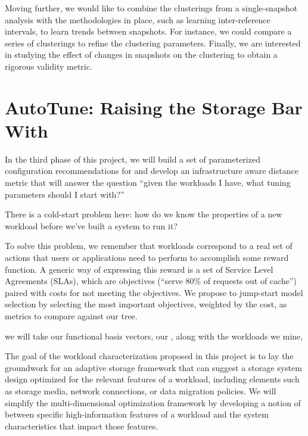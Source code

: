Moving further, we would like to combine the clusterings from a single-snapshot
analysis with the methodologies in place, such as learning inter-reference
intervals, to learn trends between snapshots.
For instance, we could compare a
series of clusterings to refine the clustering parameters.  Finally, we are
interested in studying the effect of changes in snapshots on the clustering to
obtain a rigorous validity metric.
\section{AutoTune: Raising the Storage Bar With \Mws}%


In the third phase of this project, we will build a set of parameterized configuration
recommendations for \mws and develop an infrastructure aware distance metric
that will answer the question ``given the workloads I have, what tuning
parameters should I start with?''

There is a cold-start problem here: how do we know the properties of a new
workload before we've built a system to run it?  

To solve this problem, we remember that workloads correspond to a real set of
actions that users or applications need to perform to accomplish some reward
function.  A generic way of expressing this reward is a set of Service Level
Agreements (SLAs), which are objectives (\eg ``serve 80\% of requests out of
cache'') paired with costs for not meeting the objectives.  We propose to
jump-start model selection by selecting the most important objectives, weighted
by the cost, as metrics to compare against our \mws tree.



we will take our functional basis vectors,
our \mWs, along with the workloads we mine, %


The goal of the workload characterization proposed in this project is to lay
the groundwork for an adaptive storage framework that can suggest a 
storage system design optimized for the relevant features of a workload, including elements such as storage media, network
connections, or data migration policies.  We will simplify the multi-dimensional
optimization framework by developing a notion of \systemfit between specific
high-information features of a workload and the system characteristics that
impact those features.  %


